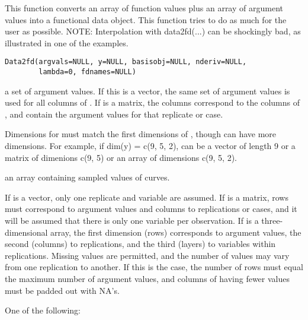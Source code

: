 \begin{Description}\relax
This function converts an array  of function values plus an
array  of argument values into a functional data object.
This function tries to do as much for the user as possible.  NOTE:
Interpolation with data2fd(...) can be shockingly bad, as illustrated
in one of the examples.
\end{Description}
\begin{Usage}
\begin{verbatim}
Data2fd(argvals=NULL, y=NULL, basisobj=NULL, nderiv=NULL,
        lambda=0, fdnames=NULL)
\end{verbatim}
\end{Usage}
\begin{Arguments}
\begin{ldescription}
\item[\code{argvals}] a set of argument values.  If this is a vector, the same set of
argument values is used for all columns of .  If
 is a matrix, the columns correspond to the columns of
, and contain the argument values for that replicate or
case.

Dimensions for  must match the first dimensions of
, though  can have more dimensions.  For example, if
dim(y) = c(9, 5, 2),  can be a vector of length 9 or a
matrix of dimenions c(9, 5) or an array of dimensions c(9, 5, 2).  

\item[\code{y}] an array containing sampled values of curves.

If  is a vector, only one replicate and variable are
assumed.  If  is a matrix, rows must correspond to argument 
values and columns to replications or cases, and it will be assumed
that there is only one variable per observation.  If  is a
three-dimensional array, the first dimension (rows) corresponds to
argument values, the second (columns) to replications, and the third
(layers) to variables within replications.  Missing values are
permitted, and the number of values may vary from one replication to
another.  If this is the case, the number of rows must equal the
maximum number of argument values, and columns of  having
fewer values must be padded out with NA's.   

\item[\code{basisobj}] One of the following:


\end{ldescription}
\end{Arguments}
